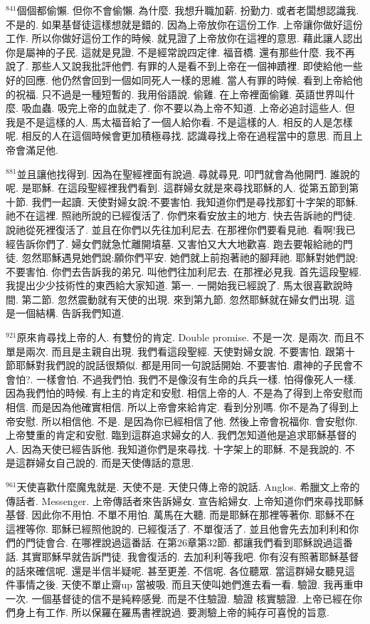 \documentclass{book}
\begin{document}
$^{841}$個個都偷懶.
但你不會偷懶.
為什麼.
我想升職加薪.
扮勤力.
或者老闆想認識我.
不是的.
如果基督徒這樣想就是錯的.
因為上帝放你在這份工作.
上帝讓你做好這份工作.
所以你做好這份工作的時候.
就見證了上帝放你在這裡的意思.
藉此讓人認出你是屬神的子民.
這就是見證.
不是經常說四定律.
福音橋.
還有那些什麼.
我不再說了.
那些人又說我批評他們.
有罪的人是看不到上帝在一個神蹟裡.
即使給他一些好的回應.
他仍然會回到一個如同死人一樣的思維.
當人有罪的時候.
看到上帝給他的祝福.
只不過是一種短暫的.
我用俗語說.
偷雞.
在上帝裡面偷雞.
英語世界叫什麼.
吸血蟲.
吸完上帝的血就走了.
你不要以為上帝不知道.
上帝必追討這些人.
但我是不是這樣的人.
馬太福音給了一個人給你看.
不是這樣的人.
相反的人是怎樣呢.
相反的人在這個時候會更加積極尋找.
認識尋找上帝在過程當中的意思.
而且上帝會滿足他.

$^{881}$並且讓他找得到.
因為在聖經裡面有說過.
尋就尋見.
叩門就會為他開門.
誰說的呢.
是耶穌.
在這段聖經裡我們看到.
這群婦女就是來尋找耶穌的人.
從第五節到第十節.
我們一起讀.
天使對婦女說:不要害怕.
我知道你們是尋找那釘十字架的耶穌.
祂不在這裡.
照祂所說的已經復活了.
你們來看安放主的地方.
快去告訴祂的門徒.
說祂從死裡復活了.
並且在你們以先往加利尼去.
在那裡你們要看見祂.
看啊!我已經告訴你們了.
婦女們就急忙離開墳墓.
又害怕又大大地歡喜.
跑去要報給祂的門徒.
忽然耶穌遇見她們說:願你們平安.
她們就上前抱著祂的腳拜祂.
耶穌對她們說:不要害怕.
你們去告訴我的弟兄.
叫他們往加利尼去.
在那裡必見我.
首先這段聖經.
我提出少少技術性的東西給大家知道.
第一.
一開始我已經說了.
馬太很喜歡說時間.
第二節.
忽然震動就有天使的出現.
來到第九節.
忽然耶穌就在婦女們出現.
這是一個結構.
告訴我們知道.

$^{921}$原來肯尋找上帝的人.
有雙份的肯定.
Double promise.
不是一次.
是兩次.
而且不單是兩次.
而且是主親自出現.
我們看這段聖經.
天使對婦女說.
不要害怕.
跟第十節耶穌對我們說的說話很類似.
都是用同一句說話開始.
不要害怕.
肅神的子民會不會怕?.
一樣會怕.
不過我們怕.
我們不是像沒有生命的兵兵一樣.
怕得像死人一樣.
因為我們怕的時候.
有上主的肯定和安慰.
相信上帝的人.
不是為了得到上帝安慰而相信.
而是因為他確實相信.
所以上帝會來給肯定.
看到分別嗎.
你不是為了得到上帝安慰.
所以相信他.
不是.
是因為你已經相信了他.
然後上帝會祝福你.
會安慰你.
上帝雙重的肯定和安慰.
臨到這群追求婦女的人.
我們怎知道他是追求耶穌基督的人.
因為天使已經告訴他.
我知道你們是來尋找.
十字架上的耶穌.
不是我說的.
不是這群婦女自己說的.
而是天使傳話的意思.

$^{961}$天使喜歡什麼魔鬼就是.
天使不是.
天使只傳上帝的說話.
Anglos.
希臘文上帝的傳話者.
Messenger.
上帝傳話者來告訴婦女.
宣告給婦女.
上帝知道你們來尋找耶穌基督.
因此你不用怕.
不單不用怕.
萬馬在大聽.
而是耶穌在那裡等著你.
耶穌不在這裡等你.
耶穌已經照他說的.
已經復活了.
不單復活了.
並且他會先去加利利和你們的門徒會合.
在哪裡說過這番話.
在第26章第32節.
都讓我們看到耶穌說過這番話.
其實耶穌早就告訴門徒.
我會復活的.
去加利利等我吧.
你有沒有照著耶穌基督的話來確信呢.
還是半信半疑呢.
甚至更差.
不信呢.
各位聽眾.
當這群婦女聽見這件事情之後.
天使不單止齋up 當被吸.
而且天使叫她們進去看一看.
驗證.
我再重申一次.
一個基督徒的信不是純粹感覺.
而是不住驗證.
驗證 核實驗證.
上帝已經在你們身上有工作.
所以保羅在羅馬書裡說過.
要測驗上帝的純存可喜悅的旨意.
\end{document}
